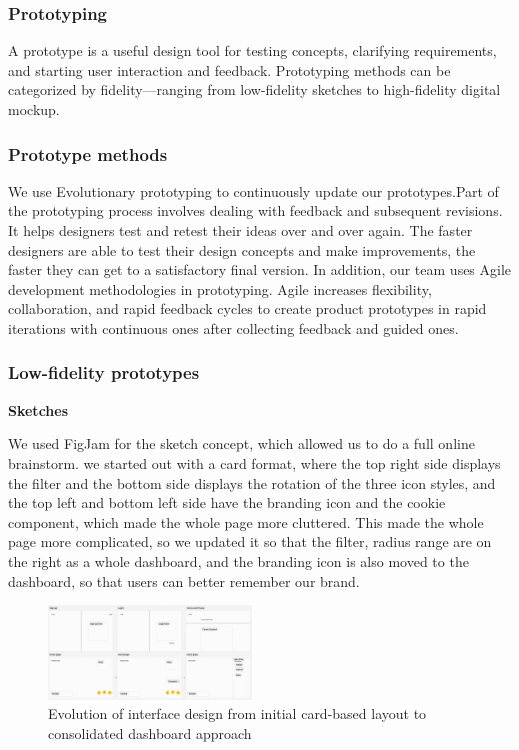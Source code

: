 \subsubsection{Prototyping}

A prototype is a useful design tool for testing concepts, clarifying requirements, and starting user interaction and feedback.
Prototyping methods can be categorized by fidelity—ranging from low-fidelity sketches to high-fidelity digital mockup.


\subsubsection{Prototype methods}
We use Evolutionary prototyping to continuously update our prototypes.Part of the prototyping process involves dealing with feedback and subsequent revisions. It helps designers test and retest their ideas over and over again. The faster designers are able to test their design concepts and make improvements, the faster they can get to a satisfactory final version. In addition, our team uses Agile development methodologies in prototyping. Agile increases flexibility, collaboration, and rapid feedback cycles to create product prototypes in rapid iterations with continuous ones after collecting feedback and guided ones.


\subsubsection{Low-fidelity prototypes}

\item \textbf{Sketches}

We used FigJam for the sketch concept, which allowed us to do a full online brainstorm. we started out with a card format, where the top right side displays the filter and the bottom side displays the rotation of the three icon styles, and the top left and bottom left side have the branding icon and the cookie component, which made the whole page more cluttered. This made the whole page more complicated, so we updated it so that the filter, radius range are on the right as a whole dashboard, and the branding icon is also moved to the dashboard, so that users can better remember our brand.


\begin{figure}[h]
    \centering
    \includegraphics[width=0.48\textwidth]{images/sketch.jpg}
    \caption{Evolution of interface design from initial card-based layout to consolidated dashboard approach}
    \label{fig:prototype-evolution}
\end{figure}

